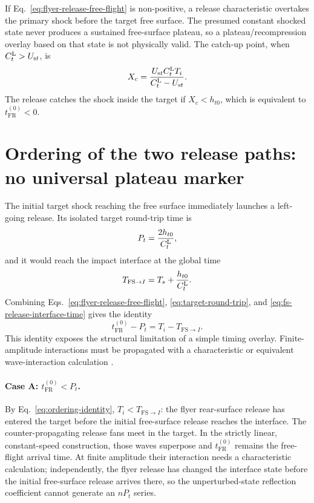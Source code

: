 \documentclass[11pt]{article}
\newcommand{\Us}[1][]{U_{\mathrm{s}#1}}
\newcommand{\tFR}{t_{\mathrm{FR}}^{(0)}}
\newcommand{\Pt}{P_t}
\begin{document}
If Eq.~\eqref{eq:flyer-release-free-flight} is non-positive, a release characteristic
overtakes the primary shock before the target free surface.  The presumed
constant shocked state never produces a sustained free-surface plateau, so a
plateau/recompression overlay based on that state is not physically valid.
The catch-up point, when $\CL[t]>\Us[t]$, is
\begin{equation}
  X_c=\frac{\Us[t]\CL[t]T_i}{\CL[t]-\Us[t]}.
  \label{eq:catchup}
\end{equation}
The release catches the shock inside the target if $X_c<h_{t0}$, which is
equivalent to $\tFR<0$.

\section{Ordering of the two release paths: no universal plateau marker}
\label{sec:release-ordering}

The initial target shock reaching the free surface immediately launches a
left-going release.  Its isolated target round-trip time is
\begin{equation}
  \Pt=\frac{2h_{t0}}{\CL[t]},
  \label{eq:target-round-trip}
\end{equation}
and it would reach the impact interface at the global time
\begin{equation}
  T_{\mathrm{FS}\to I}=T_s+\frac{h_{t0}}{\CL[t]}.
  \label{eq:fs-release-interface-time}
\end{equation}
Combining Eqs.~\eqref{eq:flyer-release-free-flight},
\eqref{eq:target-round-trip}, and \eqref{eq:fs-release-interface-time} gives
the identity
\begin{equation}
  \tFR-\Pt=T_i-T_{\mathrm{FS}\to I}.
  \label{eq:ordering-identity}
\end{equation}
This identity exposes the structural limitation of a simple timing overlay.
Finite-amplitude interactions must be propagated with a characteristic or
equivalent wave-interaction calculation \cite{CourantFriedrichs1948,Davison2008}.

\paragraph{Case A: $\tFR<\Pt$.}
By Eq.~\eqref{eq:ordering-identity}, $T_i<T_{\mathrm{FS}\to I}$: the flyer
rear-surface release has entered the target before the initial free-surface
release reaches the interface.  The counter-propagating release fans meet in
the target.  In the strictly linear, constant-speed construction, those waves
superpose and $\tFR$ remains the free-flight arrival time.  At finite amplitude
their interaction needs a characteristic calculation; independently, the
flyer release has changed the interface state before the initial free-surface
release arrives there, so the unperturbed-state reflection coefficient cannot
generate an $n\Pt$ series.
\end{document}
